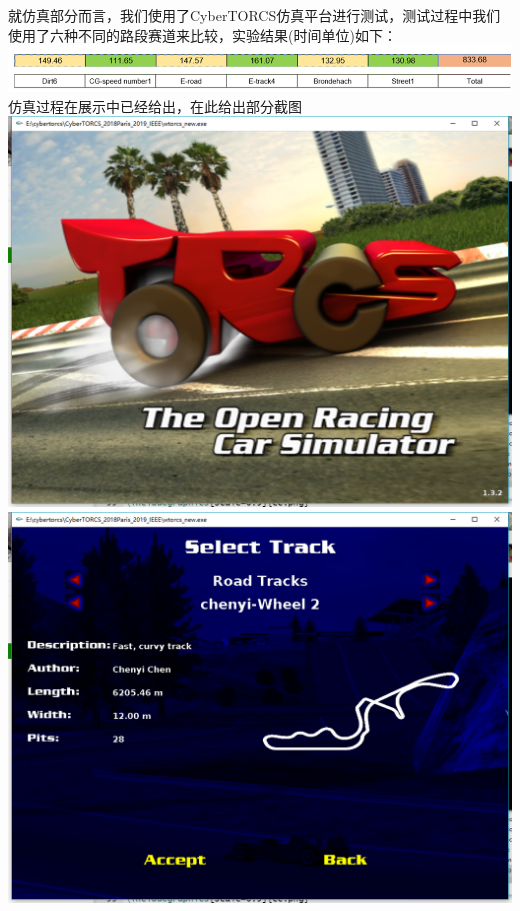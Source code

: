 \documentclass[12pt]{report}
\begin{document}
就仿真部分而言，我们使用了CyberTORCS仿真平台进行测试，测试过程中我们使用了六种不同的路段赛道来比较，实验结果(时间单位)如下：
\newline
\includegraphics[scale=0.4]{res.png}
\newline\newline
仿真过程在展示中已经给出，在此给出部分截图
\newline
\includegraphics[scale=0.3]{t1.png}
\newline
\includegraphics[scale=0.3]{t2.png}
\end{document}
